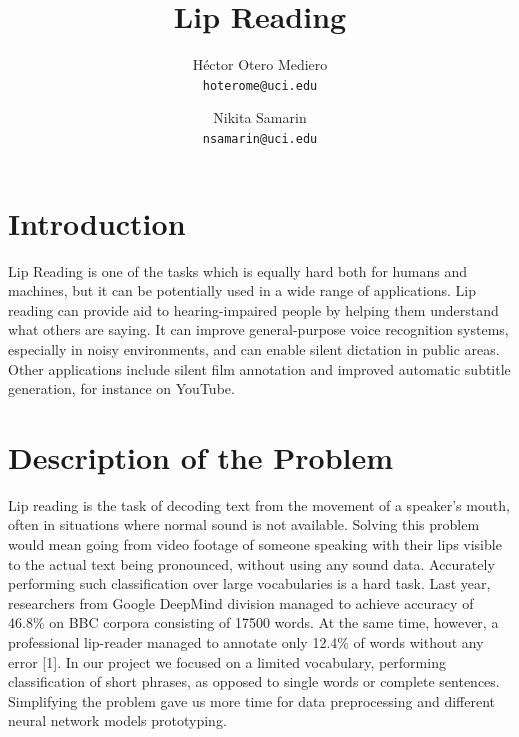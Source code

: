 \documentclass{article}[10pt]
\author{
  Héctor Otero Mediero\\      \texttt{hoterome@uci.edu}
  \and
  Nikita Samarin\\      \texttt{nsamarin@uci.edu}
}
\title{Lip Reading}
\begin{document}
\maketitle

\begin{multicols}{2}

\section{Introduction}
Lip Reading is one of the tasks which is equally hard both for humans and machines,
but it can be potentially used in a wide range of applications. Lip reading can
provide aid to hearing-impaired people by helping them understand what others are
saying. It can improve general-purpose voice recognition systems, especially in
noisy environments, and can enable silent dictation in public areas. Other
applications include silent film annotation and improved automatic subtitle
generation, for instance on YouTube.
\section{Description of the Problem}
Lip reading is the task of decoding text from the movement of a speaker’s mouth,
often in situations where normal sound is not available. Solving this problem
would mean going from video footage of someone speaking with their lips visible
to the actual text being pronounced, without using any sound data. Accurately
performing such classification over large vocabularies is a hard task.
Last year, researchers from Google DeepMind division managed to achieve accuracy
of 46.8\% on BBC corpora consisting of 17500 words. At the same time, however,
a professional lip-reader managed to annotate only 12.4\% of words without any error [1].
In our project we focused on a limited vocabulary, performing classification of short phrases,
as opposed to single words or complete sentences. Simplifying the problem gave us more time
for data preprocessing and different neural network models prototyping.

\end{multicols}
\end{document}
